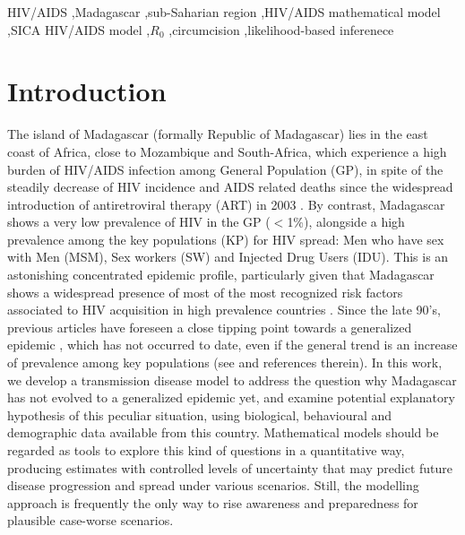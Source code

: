 \documentclass[preprint,12pt]{elsarticle}
\begin{document}
\begin{frontmatter}
\begin{keyword}
HIV/AIDS \sep Madagascar \sep sub-Saharian region \sep HIV/AIDS mathematical model \sep  SICA HIV/AIDS model \sep $R_0$ \sep circumcision \sep likelihood-based inferenece


\end{keyword}

\end{frontmatter}


\newpage

\linenumbers
\section{Introduction}
\label{S:1}
The island of Madagascar (formally Republic of Madagascar) lies in the east coast of Africa, close to Mozambique and South-Africa, which experience a high burden of HIV/AIDS infection among General Population (GP), in spite of the steadily decrease of HIV incidence and AIDS related deaths since the widespread introduction of antiretroviral therapy (ART) in 2003 \cite{UNAIDS2019}. By contrast, Madagascar shows a very low prevalence of HIV in the GP ($<$1\%), alongside a high prevalence among the key populations (KP) for HIV spread: Men who have sex with Men (MSM), Sex workers (SW) and Injected Drug Users (IDU). This is an astonishing concentrated epidemic profile, particularly given that Madagascar shows a widespread presence of most of the most recognized risk factors associated to  HIV acquisition in high prevalence countries \cite{Raberahona2020}. Since the late 90’s, previous articles have foreseen a close tipping point towards a generalized epidemic \cite{Behets2001,Raberahona2020}, which has not occurred to date, even if the general trend is an increase of prevalence among key populations (see \cite{Raberahona2020} and references therein). In this work, we develop a transmission disease model to address the question why Madagascar has not evolved to a generalized epidemic yet, and examine potential explanatory hypothesis of this peculiar situation, using biological, behavioural and demographic data available from this country. Mathematical models should be regarded as tools to explore this kind of questions in a quantitative way, producing estimates with controlled levels of uncertainty that may predict future disease progression and spread under various scenarios. Still, the modelling approach is frequently the only way to rise awareness and preparedness for plausible case-worse scenarios.
\smallskip
 
\end{document}
